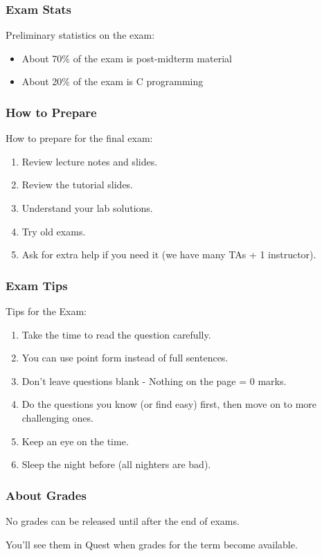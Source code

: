 \begin{frame}
\frametitle{Exam Stats}

Preliminary statistics on the exam:

\begin{itemize}
	\item About 70\% of the exam is post-midterm material
	\item About 20\% of the exam is C programming
\end{itemize}

\end{frame}

\begin{frame}
\frametitle{How to Prepare}

How to prepare for the final exam:

\begin{enumerate}
	\item Review lecture notes and slides.
	\item Review the tutorial slides.
	\item Understand your lab solutions.
	\item Try old exams.
	\item Ask for extra help if you need it (we have many TAs + 1 instructor).
\end{enumerate}

\end{frame}

\begin{frame}
\frametitle{Exam Tips}

Tips for the Exam:

\begin{enumerate}
	\item Take the time to read the question carefully.
	\item You can use point form instead of full sentences.
	\item Don't leave questions blank - Nothing on the page = 0 marks.
	\item Do the questions you know (or find easy) first, then move on to more challenging ones.
	\item Keep an eye on the time.
	\item Sleep the night before (all nighters are bad).
	
\end{enumerate}

\end{frame}

\begin{frame}
\frametitle{About Grades}

No grades can be released until after the end of exams.

You'll see them in Quest when grades for the term become available.


\end{frame}




